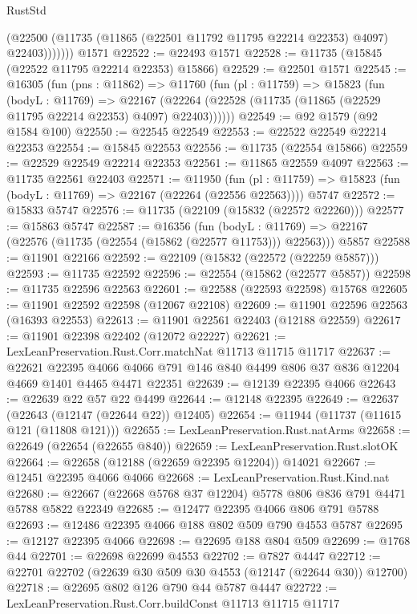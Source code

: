 \begin{lexlean}{RustStd}
\begin{coremodule}
              (@22500 (@11735 (@11865 (@22501 @11792 @11795 @22214 @22353) @4097) @22403)))))))
    @1571
@22522 := @22493 @1571
@22528 := @11735 (@15845 (@22522 @11795 @22214 @22353) @15866)
@22529 := @22501 @1571
@22545 := @16305
    (fun (pns : @11862) =>
    @11760
      (fun (pl : @11759) =>
      @15823
        (fun (bodyL : @11769) =>
        @22167 (@22264 (@22528 (@11735 (@11865 (@22529 @11795 @22214 @22353) @4097) @22403))))))
@22549 := @92 @1579 (@92 @1584 @100)
@22550 := @22545 @22549
@22553 := @22522 @22549 @22214 @22353
@22554 := @15845 @22553
@22556 := @11735 (@22554 @15866)
@22559 := @22529 @22549 @22214 @22353
@22561 := @11865 @22559 @4097
@22563 := @11735 @22561 @22403
@22571 := @11950
    (fun (pl : @11759) => @15823 (fun (bodyL : @11769) => @22167 (@22264 (@22556 @22563))))
    @5747
@22572 := @15833 @5747
@22576 := @11735 (@22109 (@15832 (@22572 @22260)))
@22577 := @15863 @5747
@22587 := @16356
    (fun (bodyL : @11769) => @22167 (@22576 (@11735 (@22554 (@15862 (@22577 @11753))) @22563)))
    @5857
@22588 := @11901 @22166
@22592 := @22109 (@15832 (@22572 (@22259 @5857)))
@22593 := @11735 @22592
@22596 := @22554 (@15862 (@22577 @5857))
@22598 := @11735 @22596 @22563
@22601 := @22588 (@22593 @22598) @15768
@22605 := @11901 @22592 @22598 (@12067 @22108)
@22609 := @11901 @22596 @22563 (@16393 @22553)
@22613 := @11901 @22561 @22403 (@12188 @22559)
@22617 := @11901 @22398 @22402 (@12072 @22227)
@22621 := LexLeanPreservation.Rust.Corr.matchNat @11713 @11715 @11717
@22637 := @22621
    @22395
    @4066
    @4066
    @791
    @146
    @840
    @4499
    @806
    @37
    @836
    @12204
    @4669
    @1401
    @4465
    @4471
    @22351
@22639 := @12139 @22395 @4066
@22643 := @22639 @22 @57 @22 @4499
@22644 := @12148 @22395
@22649 := @22637 (@22643 (@12147 (@22644 @22)) @12405)
@22654 := @11944 (@11737 (@11615 @121 (@11808 @121)))
@22655 := LexLeanPreservation.Rust.natArms
@22658 := @22649 (@22654 (@22655 @840))
@22659 := LexLeanPreservation.Rust.slotOK
@22664 := @22658 (@12188 (@22659 @22395 @12204)) @14021
@22667 := @12451 @22395 @4066 @4066
@22668 := LexLeanPreservation.Rust.Kind.nat
@22680 := @22667 (@22668 @5768 @37 @12204) @5778 @806 @836 @791 @4471 @5788 @5822 @22349
@22685 := @12477 @22395 @4066 @806 @791 @5788
@22693 := @12486 @22395 @4066 @188 @802 @509 @790 @4553 @5787
@22695 := @12127 @22395 @4066
@22698 := @22695 @188 @804 @509
@22699 := @1768 @44
@22701 := @22698 @22699 @4553
@22702 := @7827 @4447
@22712 := @22701 @22702 (@22639 @30 @509 @30 @4553 (@12147 (@22644 @30)) @12700)
@22718 := @22695 @802 @126 @790 @44 @5787 @4447
@22722 := LexLeanPreservation.Rust.Corr.buildConst @11713 @11715 @11717

\end{coremodule}
\end{lexlean}
